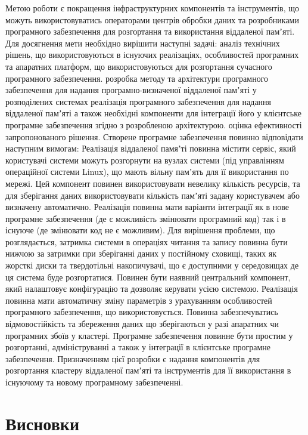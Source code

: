 \documentclass[14pt]{article}
\begin{document}
Метою роботи є покращення інфраструктурних компонентів та інструментів, що можуть використовуватись операторами центрів обробки даних та розробниками програмного забезпечення для розгортання та використання віддаленої памʼяті. Для досягнення мети необхідно вирішити наступні задачі:
аналіз технічних рішень, що використовуються в існуючих реалізаціях, особливостей програмних та апаратних платформ, що використовуються для розгортання сучасного програмного забезпечення.
розробка методу та архітектури програмного забезпечення для надання програмно-визначеної віддаленої памʼяті у розподілених системах
реалізація програмного забезпечення для надання віддаленої памʼяті а також необхідні компоненти для інтеграції його у клієнтське програмне забезпечення згідно з розробленою архітектурою.
оцінка ефективності запропонованого рішення.
Створене програмне забезпечення повинно відповідати наступним вимогам:
Реалізація віддаленої памяʼті повинна містити сервіс, який користувачі системи можуть розгорнути на вузлах системи (під управлінням операційної системи Linux), що мають вільну памʼять для її використання по мережі. Цей компонент повинен використовувати невелику кількість ресурсів, та для зберігання даних використовувати кількість памʼяті задану користувачем або визначену автоматично.
Реалізація повинна мати варіанти інтеграції як в нове програмне забезпечення (де є можливість змінювати програмний код) так і в існуюче (де змінювати код не є можливим).
Для вирішення проблеми, що розглядається, затримка системи в операціях читання та запису повинна бути нижчою за затримки при зберіганні даних у постійному сховищі, таких як жорсткі диски та твердотільні накопичувачі, що є доступними у середовищах де ця система буде розгортатися.
Повинен бути наявний центральний компонент, який налаштовує конфігурацію та дозволяє керувати усією системою.
Реалізація повинна мати автоматичну зміну параметрів з урахуванням особливостей програмного забезпечення, що використовується.
Повинна забезпечуватись відмовостійкість та збереження даних що зберігаються у разі апаратних чи програмних збоїв у кластері.
Програмне забезпечення повинне бути простим у розгортанні,  адмініструванні а також у інтеграції в клієнтське програмне забезпечення.
	Призначенням цієї розробки є надання компонентів для розгортання кластеру віддаленої памʼяті та інструментів для її використання в існуючому та новому програмному забезпеченні.

\section{Висновки}
\end{document}
